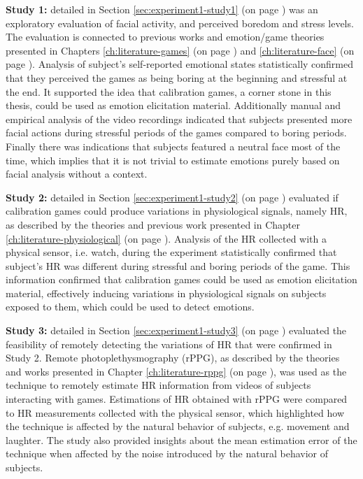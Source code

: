 \textbf{Study 1:} detailed in Section \ref{sec:experiment1-study1} (on page \pageref{sec:experiment1-study1}) was an exploratory evaluation of facial activity, and perceived boredom and stress levels. The evaluation is connected to previous works and emotion/game theories presented in Chapters \ref{ch:literature-games} (on page \pageref{ch:literature-games}) and \ref{ch:literature-face} (on page \pageref{ch:literature-face}). Analysis of subject's self-reported emotional states statistically confirmed that they perceived the games as being boring at the beginning and stressful at the end. It supported the idea that calibration games, a corner stone in this thesis, could be used as emotion elicitation material. Additionally manual and empirical analysis of the video recordings indicated that subjects presented more facial actions during stressful periods of the games compared to boring periods. Finally there was indications that subjects featured a neutral face most of the time, which implies that it is not trivial to estimate emotions purely based on facial analysis without a context.

\textbf{Study 2:} detailed in Section \ref{sec:experiment1-study2} (on page \pageref{sec:experiment1-study2}) evaluated if calibration games could produce variations in physiological signals, namely HR, as described by the theories and previous work presented in Chapter \ref{ch:literature-physiological} (on page \pageref{ch:literature-physiological}). Analysis of the HR collected with a physical sensor, i.e. watch, during the experiment statistically confirmed that subject's HR was different during stressful and boring periods of the game. This information confirmed that calibration games could be used as emotion elicitation material, effectively inducing variations in physiological signals on subjects exposed to them, which could be used to detect emotions.

\textbf{Study 3:} detailed in Section \ref{sec:experiment1-study3} (on page \pageref{sec:experiment1-study3}) evaluated the feasibility of remotely detecting the variations of HR that were confirmed in Study 2. Remote photoplethysmography (rPPG), as described by the theories and works presented in Chapter \ref{ch:literature-rppg} (on page \pageref{ch:literature-rppg}), was used as the technique to remotely estimate HR information from videos of subjects interacting with games. Estimations of HR obtained with rPPG were compared to HR measurements collected with the physical sensor, which highlighted how the technique is affected by the natural behavior of subjects, e.g. movement and laughter. The study also provided insights about the mean estimation error of the technique when affected by the noise introduced by the natural behavior of subjects.

